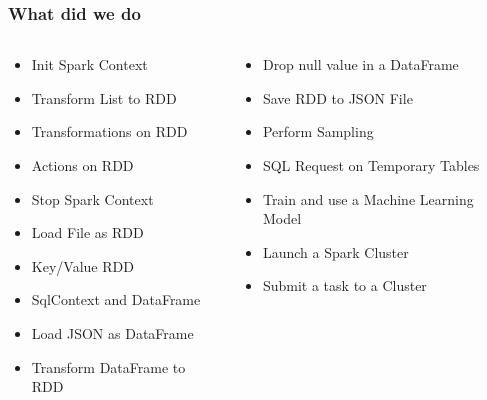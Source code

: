 \documentclass[slidetop,9pt,utf8]{beamer}
\begin{document}
\begin{frame}
  \frametitle{What did we do}

  \Large
  \begin{columns}[T] %
    \begin{column}{.48\textwidth}
      \begin{itemize}
        \item Init Spark Context
        \item Transform List to RDD
        \item Transformations on RDD
        \item Actions on RDD
        \item Stop Spark Context
        \item Load File as RDD
        \item Key/Value RDD
        \item SqlContext and DataFrame
        \item Load JSON as DataFrame
        \item Transform DataFrame to RDD
      \end{itemize}
    \end{column}%

    \hfill%
    \begin{column}{.48\textwidth}
      \begin{itemize}
        \item Drop null value in a DataFrame
        \item Save RDD to JSON File
        \item Perform Sampling
        \item SQL Request on Temporary Tables
        \item Train and use a Machine Learning Model
        \item Launch a Spark Cluster
        \item Submit a task to a Cluster
      \end{itemize}
    \end{column}%
  \end{columns}
  \normalsize
\end{frame}
\end{document}
